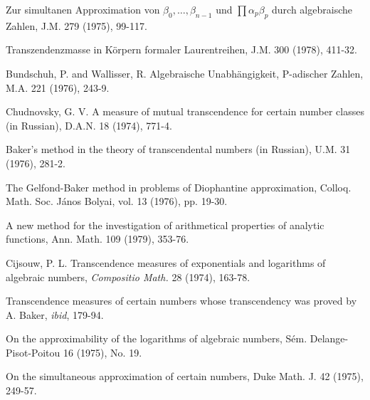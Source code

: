 \begin{hanglist}
    \item \hspace{1.5em} Zur simultanen Approximation von  $\beta_0, \ldots, \beta_{n-1}$  und  $\prod \alpha_p \beta_p$  durch algebraische Zahlen, J.M. 279 (1975), 99-117.
    \item \hspace{1.5em} Transzendenzmasse in Körpern formaler Laurentreihen, J.M. 300 (1978), 411-32.
    \item Bundschuh, P. and Wallisser, R. Algebraische Unabhängigkeit, P-adischer Zahlen, M.A. 221 (1976), 243-9.
    \item Chudnovsky, G. V. A measure of mutual transcendence for certain number classes (in Russian), D.A.N. 18 (1974), 771-4.
    \item \hspace{1.5em} Baker's method in the theory of transcendental numbers (in Russian), U.M. 31 (1976), 281-2.
    \item \hspace{1.5em} The Gelfond-Baker method in problems of Diophantine approximation, Colloq. Math. Soc. János Bolyai, vol. 13 (1976), pp. 19-30.
    \item \hspace{1.5em} A new method for the investigation of arithmetical properties of analytic functions, Ann. Math. 109 (1979), 353-76.
    \item Cijsouw, P. L. Transcendence measures of exponentials and logarithms of algebraic numbers, \textit{Compositio Math.} 28 (1974), 163-78.
    \item \hspace{1.5em} Transcendence measures of certain numbers whose transcendency was proved by A. Baker, \textit{ibid}, 179-94.
    \item \hspace{1.5em} On the approximability of the logarithms of algebraic numbers, Sém. Delange-Pisot-Poitou 16 (1975), No. 19.
    \item \hspace{1.5em} On the simultaneous approximation of certain numbers, Duke Math. J. 42 (1975), 249-57.

\end{hanglist}
